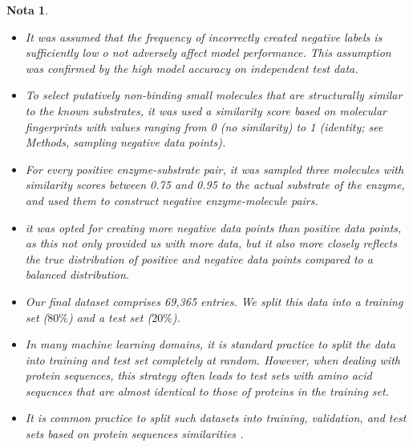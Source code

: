 \documentclass[12pt]{article}
\newtheorem{Note}{Nota}%
\begin{document}
\begin{Note}
\begin{itemize}
\item It was assumed that the frequency of incorrectly created negative labels is sufficiently low o not adversely affect model performance. This assumption was confirmed by the high model accuracy on independent test data.

\item To select putatively non-binding small molecules that are structurally similar to the known substrates, it was used a similarity score based on molecular fingerprints with values ranging from 0 (no similarity) to 1 (identity; see Methods, sampling negative data points). 

\item For every positive enzyme-substrate pair, it was sampled three molecules with similarity scores between 0.75 and 0.95 to the actual substrate of the enzyme, and used them to construct negative enzyme-molecule pairs. 

\item it was opted for creating more negative data points than positive data points, as this not only provided us with more data, but it also more closely reflects the true distribution of positive and negative data points compared to a balanced distribution.

\item Our final dataset comprises 69,365 entries. We split this data into a training set ($80\%$) and a test set ($20\%$). 

\item In many machine learning domains, it is standard practice to split the data into training and test set completely at random. However, when dealing with protein sequences, this strategy often leads to test sets with amino acid sequences that are almost identical to those of proteins in the training set. 

\item It is common practice to split such datasets into training, validation, and test sets based on protein sequences similarities \cite{2.44}.


\end{itemize}
\end{Note}
\end{document}
